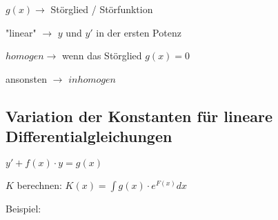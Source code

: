 \begin{multicols*}{3}
    {$g(x) \rightarrow$ Störglied / Störfunktion}

    { "linear" $\rightarrow$ $y$ und $y'$ in der ersten Potenz}

    { $homogen \rightarrow$ wenn das Störglied  $g(x)=0$}

    { ansonsten $\rightarrow$ $inhomogen$}

    \subsection{ Variation der Konstanten für lineare Differentialgleichungen}


    {       $y' + f(x) \cdot y = g(x)$}



     {$K$ berechnen: \large $K(x) = \int g(x) \cdot e^{F(x)} dx $}




    \begin{multicols*}{2}
        {Beispiel:}


        \columnbreak

        { }



    \end{multicols*}

    \WhiteSpace

    \mbox{}

\end{multicols*}


